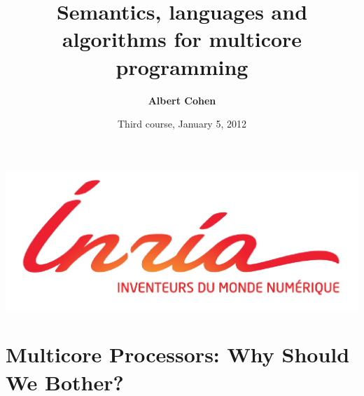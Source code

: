 \documentclass[xcolor=dvipsnames,9pt,mathserif]{beamer}
\title[]{Semantics, languages and algorithms for multicore programming}
\author{\textbf{Albert Cohen}}
\institute{INRIA and École Normale Supérieure\\
  \url{http://www.di.ens.fr/ParkasTeam.html}}
\date{Third course, January 5, 2012}
\begin{document}
\begin{frame}
  \titlepage
  \vfill
  \bigskip
  \hfill \includegraphics[height=.8cm]{logoinria.jpg} \hfill
\end{frame}






\section{Multicore Processors: Why Should We Bother?}
\end{document}
